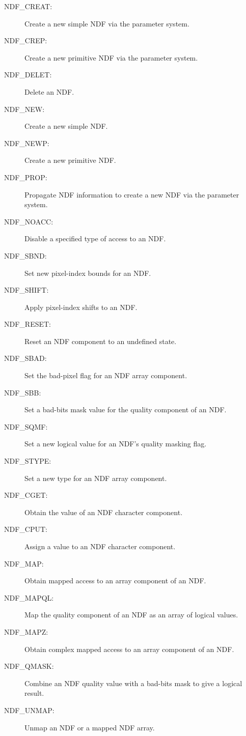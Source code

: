 \begin{description}
\begin{description}
\item [NDF\_CREAT:]  Create a new simple NDF via the parameter system.
\item [NDF\_CREP:]  Create a new primitive NDF via the parameter system.
\item [NDF\_DELET:]  Delete an NDF.
\item [NDF\_NEW:]  Create a new simple NDF.
\item [NDF\_NEWP:]  Create a new primitive NDF.
\item [NDF\_PROP:]  Propagate NDF information to create a new NDF via the parameter system.
\end{description}

\item [Setting NDF attributes ---]

\begin{description}
\item [NDF\_NOACC:]  Disable a specified type of access to an NDF.
\item [NDF\_SBND:]  Set new pixel-index bounds for an NDF.
\item [NDF\_SHIFT:]  Apply pixel-index shifts to an NDF.
\end{description}

\item [Setting component attributes ---]

\begin{description}
\item [NDF\_RESET:]  Reset an NDF component to an undefined state.
\item [NDF\_SBAD:]  Set the bad-pixel flag for an NDF array component.
\item [NDF\_SBB:]  Set a bad-bits mask value for the quality component of an NDF.
\item [NDF\_SQMF:]  Set a new logical value for an NDF's quality masking flag.
\item [NDF\_STYPE:]  Set a new type for an NDF array component.
\end{description}

\item [Accessing component values ---]

\begin{description}
\item [NDF\_CGET:]  Obtain the value of an NDF character component.
\item [NDF\_CPUT:]  Assign a value to an NDF character component.
\item [NDF\_MAP:]  Obtain mapped access to an array component of an NDF.
\item [NDF\_MAPQL:]  Map the quality component of an NDF as an array of logical values.
\item [NDF\_MAPZ:]  Obtain complex mapped access to an array component of an NDF.
\item [NDF\_QMASK:]  Combine an NDF quality value with a bad-bits mask to give a logical result.
\item [NDF\_UNMAP:]  Unmap an NDF or a mapped NDF array.
\end{description}


\end{description}
